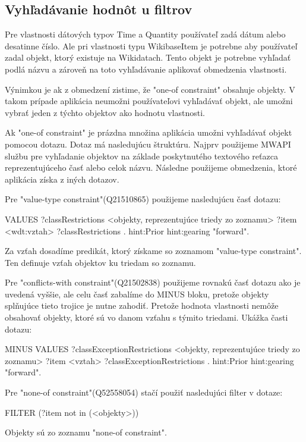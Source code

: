 \subsection{Vyhľadávanie hodnôt u filtrov}
Pre vlastnosti dátových typov Time a Quantity používateľ zadá dátum alebo desatinne číslo.
Ale pri vlastnosti typu WikibaseItem je potrebne aby používateľ zadal objekt, ktorý existuje na Wikidatach.
Tento objekt je potrebne vyhľadať podlá názvu a zároveň na toto vyhľadávanie aplikovať obmedzenia vlastnosti.

Výnimkou je ak z obmedzení zistime, že "one-of constraint" obsahuje objekty. V takom prípade
aplikácia neumožni používateľovi vyhľadávať objekt, ale umožni vybrať jeden z týchto objektov
ako hodnotu vlastnosti.

Ak "one-of constraint" je prázdna množina aplikácia umožni vyhľadávať objekt pomocou dotazu.
Dotaz má nasledujúcu štruktúru. Najprv použijeme MWAPI službu pre vyhľadanie objektov na základe
poskytnutého textového reťazca reprezentujúceho časť alebo celok názvu. Následne použijeme obmedzenia, ktoré aplikácia získa z iných dotazov.

Pre "value-type constraint"(Q21510865) použijeme nasledujúcu časť dotazu:
\begin{code}
      VALUES ?classRestrictions {<objekty, reprezentujúce triedy zo zoznamu> }
      ?item <wdt:vztah> ?classRestrictions .
      hint:Prior hint:gearing "forward".
\end{code}
Za vzťah dosadíme predikát, ktorý získame so zoznamom "value-type constraint". Ten definuje vzťah
objektov ku triedam so zoznamu.

Pre "conflicts-with constraint"(Q21502838) použijeme rovnakú časť dotazu ako je uvedená vyššie, ale
celu časť zabalíme do MINUS bloku, pretože objekty splňujúce tieto trojice je nutne zahodiť.
Pretože hodnota vlastnosti nemôže obsahovať objekty, ktoré sú vo danom vzťahu s týmito triedami.
Ukážka časti dotazu:
\begin{code}
      MINUS{
      VALUES ?classExceptionRestrictions {<objekty, reprezentujúce triedy zo zoznamu> }
      ?item <vztah> ?classExceptionRestrictions .
      hint:Prior hint:gearing "forward".
      }
\end{code}

Pre "none-of constraint"(Q52558054) stačí použiť nasledujúci filter v dotaze:
\begin{code}
      FILTER (?item not in (<objekty>))
\end{code}
Objekty sú zo zoznamu  "none-of constraint".

